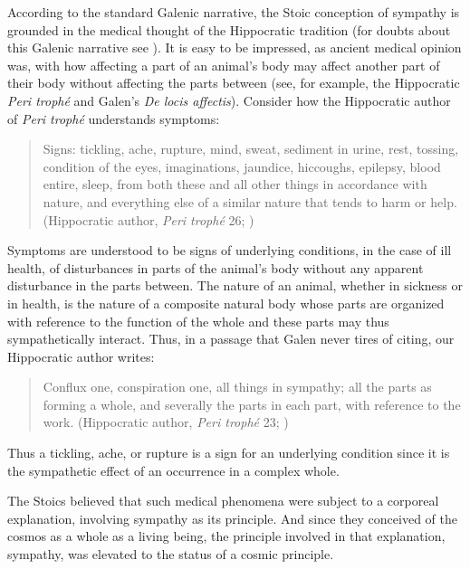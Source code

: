 According to the standard Galenic narrative, the Stoic conception of sympathy is grounded in the medical thought of the Hippocratic tradition (for doubts about this Galenic narrative see \citealt{Holmes:2015aa}). It is easy to be impressed, as ancient medical opinion was, with how affecting a part of an animal's body may affect another part of their body without affecting the parts between (see, for example, the Hippocratic \emph{Peri troph\'{e}} and Galen's \emph{De locis affectis}). Consider how the Hippocratic author of \emph{Peri troph\'{e}} understands symptoms: 
\begin{quote}
	Signs: tickling, ache, rupture, mind, sweat, sediment in urine, rest, tossing, condition of the eyes, imaginations, jaundice, hiccoughs, epilepsy, blood entire, sleep, from both these and all other things in accordance with nature, and everything else of a similar nature that tends to harm or help. (Hippocratic author, \emph{Peri troph\'{e}} 26; \citealt[351]{Jones:1957aa})
\end{quote}
Symptoms are understood to be signs of underlying conditions, in the case of ill health, of disturbances in parts of the animal's body without any apparent disturbance in the parts between. The nature of an animal, whether in sickness or in health, is the nature of a composite natural body whose parts are organized with reference to the function of the whole and these parts may thus sympathetically interact. Thus, in a passage that Galen never tires of citing, our Hippocratic author writes:
\begin{quote}
	Conflux one, conspiration one, all things in sympathy; all the parts as forming a whole, and severally the parts in each part, with reference to the work. (Hippocratic author, \emph{Peri troph\'{e}} 23; \citealt[351]{Jones:1957aa})
\end{quote}
Thus a tickling, ache, or rupture is a sign for an underlying condition since it is the sympathetic effect of an occurrence in a complex whole. 

The Stoics believed that such medical phenomena were subject to a corporeal explanation, involving sympathy as its principle. And since they conceived of the cosmos as a whole as a living being, the principle involved in that explanation, sympathy, was elevated to the status of a cosmic principle.

